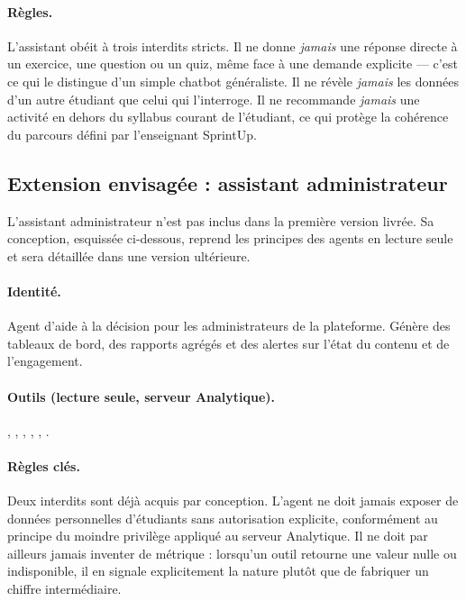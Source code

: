 \paragraph{Règles.} L'assistant obéit à trois interdits stricts. Il
ne donne \emph{jamais} une réponse directe à un exercice, une
question ou un quiz, même face à une demande explicite — c'est ce
qui le distingue d'un simple chatbot généraliste. Il ne révèle
\emph{jamais} les données d'un autre étudiant que celui qui
l'interroge. Il ne recommande \emph{jamais} une activité en dehors
du syllabus courant de l'étudiant, ce qui protège la cohérence du
parcours défini par l'enseignant SprintUp.

\subsection{Extension envisagée : assistant administrateur}
\label{sec:agent6}

L'assistant administrateur n'est pas inclus dans la première version livrée.
Sa conception, esquissée ci-dessous, reprend les principes des agents en
lecture seule et sera détaillée dans une version ultérieure.

\paragraph{Identité.} Agent d'aide à la décision pour les administrateurs
de la plateforme. Génère des tableaux de bord, des rapports agrégés et des
alertes sur l'état du contenu et de l'engagement.

\paragraph{Outils (lecture seule, serveur Analytique).}
,
,
,
,
,
.

\paragraph{Règles clés.} Deux interdits sont déjà acquis par
conception. L'agent ne doit jamais exposer de données personnelles
d'étudiants sans autorisation explicite, conformément au principe
du moindre privilège appliqué au serveur Analytique. Il ne doit
par ailleurs jamais inventer de métrique : lorsqu'un outil retourne
une valeur nulle ou indisponible, il en signale explicitement la
nature plutôt que de fabriquer un chiffre intermédiaire.


